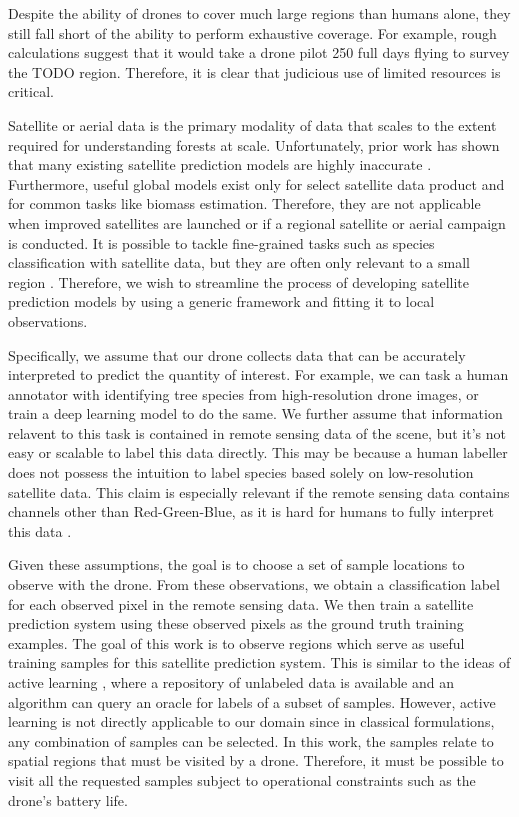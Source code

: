 Despite the ability of drones to cover much large regions than humans alone, they still fall short of the ability to perform  exhaustive coverage. For example, rough calculations suggest that it would take a drone pilot 250 full days flying to survey the TODO region. Therefore, it is clear that judicious use of limited resources is critical.

Satellite or aerial data is the primary modality of data that scales to the extent required for understanding forests at scale. Unfortunately, prior work has shown that many existing satellite prediction models are highly inaccurate \cite{}. Furthermore, useful global models exist only for select satellite data product and for common tasks like biomass estimation. Therefore, they are not applicable when improved satellites are launched or if a regional satellite or aerial campaign is conducted.
It is possible to tackle fine-grained tasks such as species classification with satellite data, but they are often only relevant to a small region \cite{Sweden}. 
Therefore, we wish to streamline the process of developing satellite prediction models by using a generic framework and fitting it to local observations.

Specifically, we assume that our drone collects data that can be accurately interpreted to predict the quantity of interest. For example, we can task a human annotator with identifying tree species from high-resolution drone images, or train a deep learning model to do the same. We further assume that information relavent to this task is contained in remote sensing data of the scene, but it's not easy or scalable to label this data directly. This may be because a human labeller does not possess the intuition to label species based solely on low-resolution satellite data. This claim is especially relevant if the remote sensing data contains channels other than Red-Green-Blue, as it is hard for humans to fully interpret this data \cite{Hard to label multispectral}.

Given these assumptions, the goal is to choose a set of sample locations to observe with the drone. From these observations, we obtain a classification label for each observed pixel in the remote sensing data. We then train a satellite prediction system using these observed pixels as the ground truth training examples. The goal of this work is to observe regions which serve as useful training samples for this satellite prediction system. This is similar to the ideas of active learning \cite{Ren2022ALearning}, where a repository of unlabeled data is available and an algorithm can query an oracle for labels of a subset of samples. However, active learning is not directly applicable to our domain since in classical formulations, any combination of samples can be selected. In this work, the samples relate to spatial regions that must be visited by a drone. Therefore, it must be possible to visit all the requested samples subject to operational constraints such as the drone's battery life.

